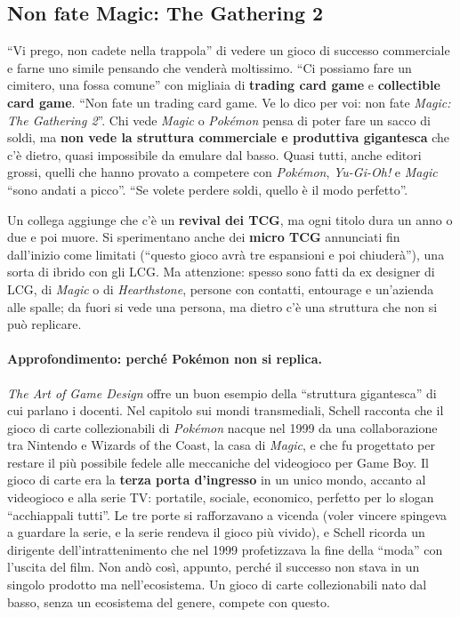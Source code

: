\subsection{Non fate Magic: The Gathering 2}

``Vi prego, non cadete nella trappola'' di vedere un gioco di successo commerciale
e farne uno simile pensando che venderà moltissimo. ``Ci possiamo fare un
cimitero, una fossa comune'' con migliaia di \textbf{trading card game} e
\textbf{collectible card game}. ``Non fate un trading card game. Ve lo dico per
voi: non fate \emph{Magic: The Gathering 2}''. Chi vede \emph{Magic} o
\emph{Pokémon} pensa di poter fare un sacco di soldi, ma \textbf{non vede la
struttura commerciale e produttiva gigantesca} che c'è dietro, quasi impossibile
da emulare dal basso. Quasi tutti, anche editori grossi, quelli che hanno provato
a competere con \emph{Pokémon}, \emph{Yu-Gi-Oh!} e \emph{Magic} ``sono andati a
picco''. ``Se volete perdere soldi, quello è il modo perfetto''.

Un collega aggiunge che c'è un \textbf{revival dei TCG}, ma ogni titolo dura un
anno o due e poi muore. Si sperimentano anche dei \textbf{micro TCG} annunciati
fin dall'inizio come limitati (``questo gioco avrà tre espansioni e poi
chiuderà''), una sorta di ibrido con gli LCG. Ma attenzione: spesso sono fatti
da ex designer di LCG, di \emph{Magic} o di \emph{Hearthstone}, persone con
contatti, entourage e un'azienda alle spalle; da fuori si vede una persona, ma
dietro c'è una struttura che non si può replicare.

\paragraph{Approfondimento: perché Pokémon non si replica.} \emph{The Art of
Game Design} offre un buon esempio della ``struttura gigantesca'' di cui parlano
i docenti. Nel capitolo sui mondi transmediali, Schell racconta che il gioco di
carte collezionabili di \emph{Pokémon} nacque nel 1999 da una collaborazione tra
Nintendo e Wizards of the Coast, la casa di \emph{Magic}, e che fu progettato per
restare il più possibile fedele alle meccaniche del videogioco per Game Boy. Il
gioco di carte era la \textbf{terza porta d'ingresso} in un unico mondo, accanto
al videogioco e alla serie TV: portatile, sociale, economico, perfetto per lo
slogan ``acchiappali tutti''. Le tre porte si rafforzavano a vicenda (voler
vincere spingeva a guardare la serie, e la serie rendeva il gioco più vivido), e
Schell ricorda un dirigente dell'intrattenimento che nel 1999 profetizzava la
fine della ``moda'' con l'uscita del film. Non andò così, appunto, perché il
successo non stava in un singolo prodotto ma nell'ecosistema. Un gioco di carte
collezionabili nato dal basso, senza un ecosistema del genere, compete con questo.

